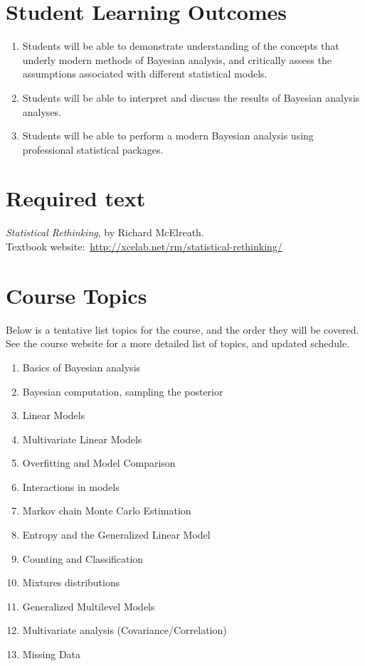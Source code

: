 \documentclass[11pt,onecolumn]{article}
\begin{document}
\section*{Student Learning Outcomes}
\begin{enumerate}
\item Students will be able to demonstrate understanding of the concepts that underly modern methods of Bayesian analysis, and critically assess the assumptions associated with different statistical models.
\item Students will be able to interpret and discuss the results of Bayesian analysis analyses.
\item Students will be able to perform a modern Bayesian analysis using professional statistical packages.
\end{enumerate}

\section*{Required text}
\emph{Statistical Rethinking}, by Richard McElreath. \\
Textbook website:~\url{http://xcelab.net/rm/statistical-rethinking/}

\section*{Course Topics}
Below is a tentative list topics for the course, and the order they will be covered. See the course website for a more detailed list of topics, and updated schedule.
\begin{enumerate}
\item Basics of Bayesian analysis
\item Bayesian computation, sampling the posterior
\item Linear Models
\item Multivariate Linear Models
\item Overfitting and Model Comparison
\item Interactions in models
\item Markov chain Monte Carlo Estimation
\item Entropy and the Generalized Linear Model
\item Counting and Classification
\item Mixtures distributions
\item Generalized Multilevel Models
\item Multivariate analysis (Covariance/Correlation)
\item Missing Data
\end{enumerate}
\end{document}
